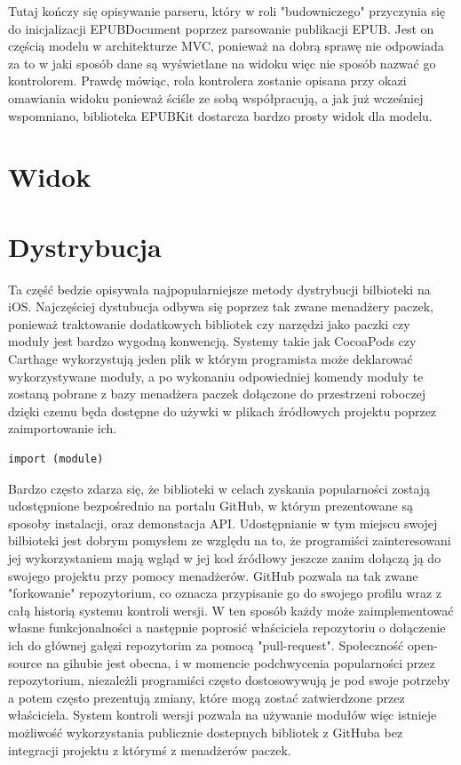 Tutaj kończy się opisywanie parseru, który w roli "budowniczego" przyczynia się do inicjalizacji EPUBDocument poprzez parsowanie publikacji EPUB. Jest on częścią modelu w architekturze MVC, ponieważ na dobrą sprawę nie odpowiada za to w jaki sposób dane są wyświetlane na widoku więc nie sposób nazwać go kontrolorem. Prawdę mówiąc, rola kontrolera zostanie opisana przy okazi omawiania widoku ponieważ ściśle ze sobą współpracują, a jak już wcześniej wspomniano, biblioteka EPUBKit dostarcza bardzo prosty widok dla modelu.

\section{Widok}

\section{Dystrybucja}

Ta część bedzie opisywała najpopularniejsze metody dystrybucji bilbioteki na iOS. Najczęściej dystubucja odbywa się poprzez tak zwane menadżery paczek, ponieważ traktowanie dodatkowych bibliotek czy narzędzi jako paczki czy moduły jest bardzo wygodną konwencją. Systemy takie jak CocoaPods czy Carthage wykorzystują jeden plik w którym programista może deklarować wykorzystywane moduły, a po wykonaniu odpowiedniej komendy moduły te zostaną pobrane z bazy menadżera paczek dołączone do przestrzeni roboczej dzięki czemu będa dostępne do używki w plikach źródłowych projektu poprzez zaimportowanie ich.

\begin{lstlisting}[language=swift-reference]
import (module)
\end{lstlisting}

Bardzo często zdarza się, że biblioteki w celach zyskania popularności zostają udostępnione bezpośrednio na portalu GitHub, w którym prezentowane są sposoby instalacji, oraz demonstacja API. Udostępnianie w tym miejscu swojej bilbioteki jest dobrym pomysłem ze względu na to, że programiści zainteresowani jej wykorzystaniem mają wgląd w jej kod źródłowy jeszcze zanim dołączą ją do swojego projektu przy pomocy menadżerów. GitHub pozwala na tak zwane "forkowanie" repozytorium, co oznacza przypisanie go do swojego profilu wraz z całą historią systemu kontroli wersji. W ten sposób każdy może zaimplementować własne funkcjonalności a następnie poprosić właściciela repozytoriu o dołączenie ich do głównej gałęzi repozytorim za pomocą "pull-request". Społeczność open-source na gihubie jest obecna, i w momencie podchwycenia popularności przez repozytorium, niezależli programiści często dostosowywują je pod swoje potrzeby a potem często prezentują zmiany, które mogą zostać zatwierdzone przez właściciela. System kontroli wersji pozwala na używanie modułów więc istnieje możliwość wykorzystania publicznie dostepnych bibliotek z GitHuba bez integracji projektu z którymś z menadżerów paczek.

